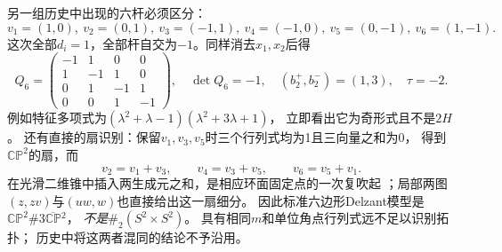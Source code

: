 \documentclass[UTF8,a4paper,11pt,fontset=fandol]{ctexart}
\numberwithin{equation}{section}
\theoremstyle{definition}
\newcommand{\CP}{\mathbb{CP}}
\begin{document}
另一组历史中出现的六杆必须区分：
\[
 v_1=(1,0),\ v_2=(0,1),\ v_3=(-1,1),\
 v_4=(-1,0),\ v_5=(0,-1),\ v_6=(1,-1).
\]
这次全部$d_i=1$，全部杆自交为$-1$。同样消去$x_1,x_2$后得
\begin{equation}\label{eq:toric-hexagon-form}
 Q_6=\begin{pmatrix}-1&1&0&0\\1&-1&1&0\\0&1&-1&1\\0&0&1&-1\end{pmatrix},
 \quad \det Q_6=-1,\quad (b_2^+,b_2^-)=(1,3),\quad \tau=-2.
\end{equation}
例如特征多项式为$(\lambda^2+\lambda-1)(\lambda^2+3\lambda+1)$，
立即看出它为奇形式且不是$2H$。
还有直接的扇识别：保留$v_1,v_3,v_5$时三个行列式均为1且三向量之和为0，
得到$\CP^2$的扇，而
\begin{equation}\label{eq:toric-hexagon-blowups}
 v_2=v_1+v_3,\qquad v_4=v_3+v_5,\qquad v_6=v_5+v_1.
\end{equation}
在光滑二维锥中插入两生成元之和，是相应环面固定点的一次复吹起
\cite[\S10.4]{CLS2011}；局部两图$(z,zv)$与$(uw,w)$也直接给出这一扇细分。
因此标准六边形Delzant模型是$\CP^2\#3\overline{\CP}{}^2$，
\emph{不是}$\#_2(S^2\times S^2)$。
具有相同$m$和单位角点行列式远不足以识别拓扑；
历史中将这两者混同的结论不予沿用。
\end{document}
